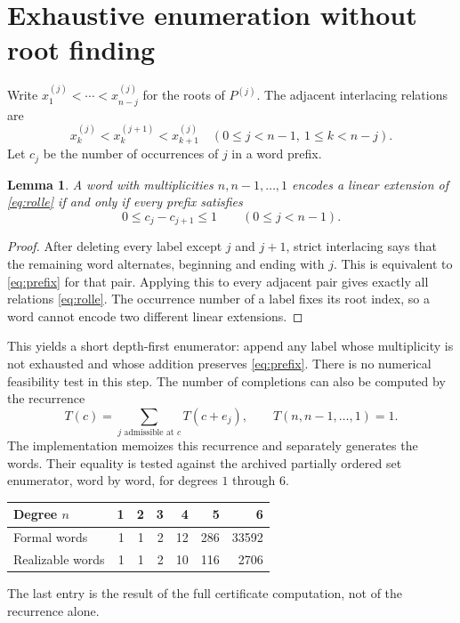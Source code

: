 \documentclass[11pt]{article}
\newtheorem{lemma}[theorem]{Lemma}
\theoremstyle{definition}
\begin{document}
\section{Exhaustive enumeration without root finding}

Write $x^{(j)}_1<\cdots<x^{(j)}_{n-j}$ for the roots of $P^{(j)}$.
The adjacent interlacing relations are
\begin{equation}\label{eq:rolle}
 x^{(j)}_k<x^{(j+1)}_k<x^{(j)}_{k+1}
 \quad(0\le j<n-1,\ 1\le k<n-j).
\end{equation}
Let $c_j$ be the number of occurrences of $j$ in a word prefix.

\begin{lemma}\label{lem:prefix}
A word with multiplicities $n,n-1,\ldots,1$ encodes a linear extension of
\eqref{eq:rolle} if and only if every prefix satisfies
\begin{equation}\label{eq:prefix}
 0\le c_j-c_{j+1}\le1\qquad(0\le j<n-1).
\end{equation}
\end{lemma}
\begin{proof}
After deleting every label except $j$ and $j+1$, strict interlacing says
that the remaining word alternates, beginning and ending with $j$.
This is equivalent to \eqref{eq:prefix} for that pair. Applying this to
every adjacent pair gives exactly all relations \eqref{eq:rolle}.
The occurrence number of a label fixes its root index, so a word cannot
encode two different linear extensions.
\end{proof}

This yields a short depth-first enumerator: append any label whose
multiplicity is not exhausted and whose addition preserves
\eqref{eq:prefix}. There is no numerical feasibility test in this step.
The number of completions can also be computed by the recurrence
\begin{equation}\label{eq:dp}
 T(c)=\sum_{j\text{ admissible at }c}T(c+e_j),
 \qquad T(n,n-1,\ldots,1)=1.
\end{equation}
The implementation memoizes this recurrence and separately generates the
words. Their equality is tested against the archived partially ordered
set enumerator, word by word, for degrees $1$ through $6$.

\begin{center}
\begin{tabular}{lrrrrrr}
\toprule
Degree $n$&1&2&3&4&5&6\\
\midrule
Formal words&1&1&2&12&286&33592\\
Realizable words&1&1&2&10&116&2706\\
\bottomrule
\end{tabular}
\end{center}
The last entry is the result of the full certificate computation, not of
the recurrence alone.
\end{document}
